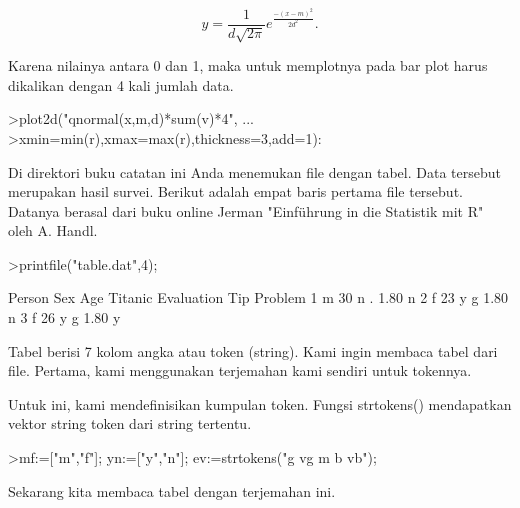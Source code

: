 \documentclass[a4paper,10pt]{article}
\begin{document}
\begin{eulernotebook}
\begin{eulercomment}
\begin{eulercomment}
\begin{eulercomment}
\end{eulercomment}
\begin{eulerformula}
\[
y=\frac{1}{d\sqrt{2\pi}}e^{\frac{-(x-m)^2}{2d^2}}.
\]
\end{eulerformula}
\begin{eulercomment}
Karena nilainya antara 0 dan 1, maka untuk memplotnya pada bar plot
harus dikalikan dengan 4 kali jumlah data.
\end{eulercomment}
\begin{eulerprompt}
>plot2d("qnormal(x,m,d)*sum(v)*4", ...
>xmin=min(r),xmax=max(r),thickness=3,add=1):
\end{eulerprompt}
\begin{eulercomment}
Di direktori buku catatan ini Anda menemukan file dengan tabel. Data
tersebut merupakan hasil survei. Berikut adalah empat baris pertama
file tersebut. Datanya berasal dari buku online Jerman "Einführung in
die Statistik mit R" oleh A. Handl.
\end{eulercomment}
\begin{eulerprompt}
>printfile("table.dat",4);
\end{eulerprompt}
\begin{euleroutput}
  Person Sex Age Titanic Evaluation Tip Problem
  1 m 30 n . 1.80 n
  2 f 23 y g 1.80 n
  3 f 26 y g 1.80 y
\end{euleroutput}
\begin{eulercomment}
Tabel berisi 7 kolom angka atau token (string). Kami ingin membaca
tabel dari file. Pertama, kami menggunakan terjemahan kami sendiri
untuk tokennya.

Untuk ini, kami mendefinisikan kumpulan token. Fungsi strtokens()
mendapatkan vektor string token dari string tertentu.
\end{eulercomment}
\begin{eulerprompt}
>mf:=["m","f"]; yn:=["y","n"]; ev:=strtokens("g vg m b vb");
\end{eulerprompt}
\begin{eulercomment}
Sekarang kita membaca tabel dengan terjemahan ini.


\end{eulercomment}
\end{eulercomment}
\end{eulercomment}
\end{eulernotebook}
\end{document}
